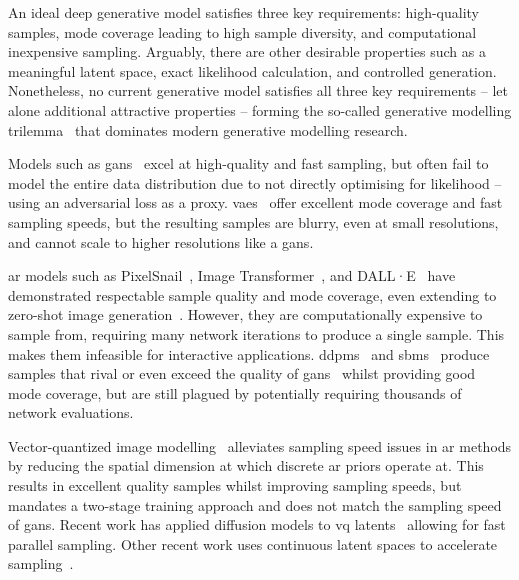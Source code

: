 An ideal deep generative model satisfies three key requirements: high-quality
samples, mode coverage leading to high sample diversity, and computational
inexpensive sampling. Arguably, there are other desirable properties such as a
meaningful latent space, exact likelihood calculation, and controlled
generation. Nonetheless, no current generative model satisfies all three key
requirements -- let alone additional attractive properties -- forming the
so-called generative modelling trilemma~\cite{xiao2021trilemma} that dominates
modern generative modelling research.

Models such as \glspl{gan}~\cite{goodfellow2014gan} excel at high-quality and
fast sampling, but often fail to model the entire data distribution due to not
directly optimising for likelihood -- using an adversarial loss as a proxy.
\Glspl{vae}~\cite{kingma2013vae} offer excellent mode coverage and fast sampling
speeds, but the resulting samples are blurry, even at small resolutions, and
cannot scale to higher resolutions like a \glspl{gan}.

\Gls{ar} models such as PixelSnail~\cite{chen2017snail}, Image
Transformer~\cite{parmar2018image}, and DALL·E~\cite{parmar2018image} have
demonstrated respectable sample quality and mode coverage, even extending to
zero-shot image generation~\cite{ramesh2021dalle}. However, they are
computationally expensive to sample from, requiring many network iterations to
produce a single sample. This makes them infeasible for interactive
applications. \Glspl{ddpm}~\cite{ho2020ddpm} and
\glspl{sbm}~\cite{song2019sbm,song2020sde,song2021mlt} produce samples that
rival or even exceed the quality of \glspl{gan}~\cite{dhariwal2021ddpm} whilst
providing good mode coverage, but are still plagued by potentially
requiring thousands of network evaluations.

Vector-quantized image
modelling~\cite{oord2017vqvae,razavi2019generating,esser2021taming} alleviates
sampling speed issues in \gls{ar} methods by reducing the spatial dimension at
which discrete \gls{ar} priors operate at. This results in excellent quality
samples whilst improving sampling speeds, but mandates a two-stage training
approach and does not match the sampling speed of \glspl{gan}. Recent work has
applied diffusion models to \gls{vq} latents~\cite{bondtaylor2021unleashing}
allowing for fast parallel sampling. Other recent work uses continuous latent
spaces to accelerate sampling~\cite{xiao2021trilemma,vahdat2021sbmlatent}.

